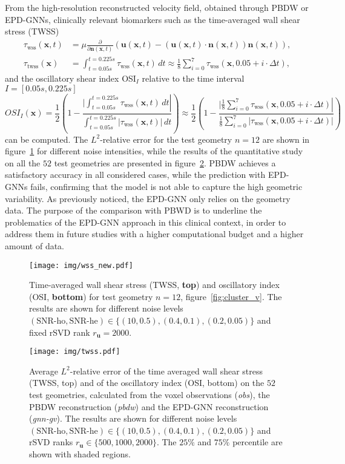 From the high-resolution reconstructed velocity field, obtained through PBDW or EPD-GNNs, clinically relevant biomarkers such as the time-averaged wall shear stress (TWSS)
\begin{align*}
  \tau_{\text{wss}}(\mathbf{x}, t)&=\mu\frac{\partial}{\partial\mathbf{n}(\mathbf{x}, t)}\left(\mathbf{u}(\mathbf{x}, t)-(\mathbf{u}(\mathbf{x}, t)\cdot\mathbf{n}(\mathbf{x}, t))\mathbf{n}(\mathbf{x}, t)\right),\\
  \tau_{\text{twss}}(\mathbf{x})&=\int_{t=0.05s}^{t=0.225s}\tau_{\text{wss}}(\mathbf{x}, t)\,dt\approx\frac{1}{8}\sum_{i=0}^{7}\tau_{\text{wss}}(\mathbf{x}, 0.05+i\cdot\Delta t),
\end{align*}
and the oscillatory shear index OSI$_I$ relative to the time interval $I=[0.05s,0.225s]$
\[
  OSI_{I}(\mathbf{x})=\frac{1}{2}\left(1-\frac{\left.|\int_{t=0.05s}^{t=0.225s}\tau_{\text{wss}}(\mathbf{x}, t)\,dt\right|}{\int_{t=0.05s}^{t=0.225s}|\tau_{\text{wss}}(\mathbf{x}, t)|\,dt}\right)\approx\frac{1}{2}\left(1-\frac{\left.|\frac{1}{8}\sum_{i=0}^{7}\tau_{\text{wss}}(\mathbf{x},  0.05+i\cdot\Delta t)\right|}{\frac{1}{8}\sum_{i=0}^{7}|\tau_{\text{wss}}(\mathbf{x},  0.05+i\cdot\Delta t)|}\right)
\]
can be computed.
The $L^2$-relative error for the test geometry $n=12$ are shown in figure~\ref{fig:twss_12} for different noise intensities,
while the results of the quantitative study on all the $52$ test geometries are presented in figure~\ref{fig:twss_osi}. 
PBDW achieves a satisfactory accuracy in all considered cases, while the prediction with EPD-GNNs fails, confirming that the model is not able to capture the
high geometric variability. As previously noticed, the EPD-GNN only relies on the geometry data. 
The purpose of the comparison with PBWD is to underline the problematics of the EPD-GNN approach in this clinical context, 
in order to address them in future studies with a higher computational budget and a higher amount of data.
%
\begin{figure}[!htp]
  \centering
  \texttt{[image: img/wss\_new.pdf]}
  \caption{Time-averaged wall shear stress (TWSS, \textbf{top}) and oscillatory index (OSI, \textbf{bottom}) for test geometry $n=12$, figure~\ref{fig:cluster_v}. The results are shown for different noise levels $(\text{SNR-ho}, \text{SNR-he})\in \{(10, 0.5), (0.4, 0.1), (0.2, 0.05)\}$ and fixed rSVD rank $r_{\mathbf u}=2000$.}
  \label{fig:twss_12}
\end{figure}
%
\begin{figure}[!htp]
  \centering
  \texttt{[image: img/twss.pdf]}
  \caption{Average $L^2$-relative error of the time averaged wall shear stress (TWSS, top) and of the oscillatory index (OSI, bottom) on the $52$ test geometries,
calculated from the voxel observations (\textit{obs}), the PBDW reconstruction (\textit{pbdw}) and the EPD-GNN reconstruction (\textit{gnn-gv}).
  The results are shown for different noise levels $(\text{SNR-ho}, \text{SNR-he})\in \{(10, 0.5), (0.4, 0.1), (0.2, 0.05)\}$ and rSVD ranks $r_{\mathbf u}\in\{500, 1000, 2000\}$. The $25\%$ and $75\%$ percentile are shown with shaded regions.}
  \label{fig:twss_osi}
\end{figure}



